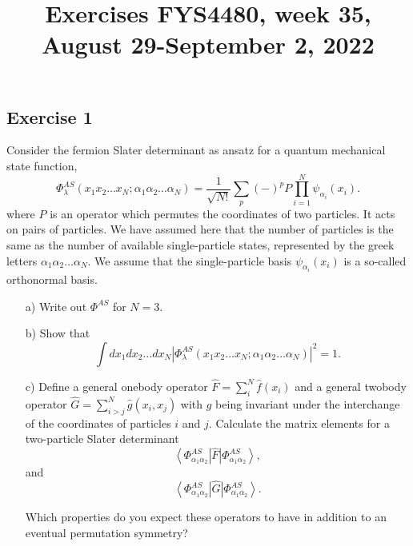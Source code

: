 \documentclass[prc]{revtex4}
\newcommand{\bra}[1]{\left\langle #1 \right|}
\newcommand{\ket}[1]{\left| #1 \right\rangle}
\begin{document}
\title{Exercises FYS4480, week 35, August 29-September 2, 2022}
\maketitle


\subsection*{Exercise 1}
Consider the fermion Slater determinant as ansatz for a quantum mechanical state function,
\[
\Phi_{\lambda}^{AS}(x_{1}x_{2}\dots x_{N};\alpha_{1}\alpha_{2}\dots\alpha_{N})
=\frac{1}{\sqrt{N!}}\sum_{p}(-)^{p}P\prod_{i=1}^{N}\psi_{\alpha_{i}}(x_{i}).
\]
where $P$ is an operator which permutes the coordinates of two particles. It acts on pairs of particles. We have assumed here that the 
number of particles is the same as the number of available single-particle states, represented by the
greek letters $\alpha_{1}\alpha_{2}\dots\alpha_{N}$. We assume that the single-particle basis $\psi_{\alpha_{i}}(x_{i})$ is a so-called orthonormal basis.
\begin{enumerate}
\item[a)] Write  out $\Phi^{AS}$ for $N=3$.  
\item[b)] Show that
\[
\int dx_{1}dx_{2}\dots dx_{N}\left\vert
\Phi_{\lambda}^{AS}(x_{1}x_{2}\dots x_{N};\alpha_{1}\alpha_{2}\dots\alpha_{N})
\right\vert^{2} = 1.
\]
\item[c)] Define a general onebody operator $\hat{F} = \sum_{i}^N\hat{f}(x_{i})$ and a general 
twobody operator $\hat{G}=\sum_{i>j}^N\hat{g}(x_{i},x_{j})$
with $g$ being invariant under the interchange of the coordinates of particles $i$ and $j$.
Calculate the matrix elements for a two-particle Slater determinant
\[
\bra{\Phi_{\alpha_{1}\alpha_{2}}^{AS}}\hat{F}\ket{\Phi_{\alpha_{1}\alpha_{2}}^{AS}},
\]
and
\[
\bra{\Phi_{\alpha_{1}\alpha_{2}}^{AS}}\hat{G}\ket{\Phi_{\alpha_{1}\alpha_{2}}^{AS}}.
\]

Which properties do you expect these operators to have in addition to an eventual permutation
symmetry?
\end{enumerate}
\end{document}
